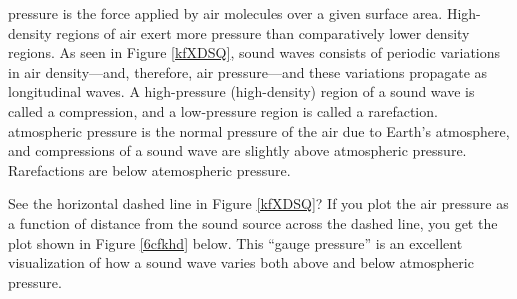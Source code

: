 \documentclass[main.tex]{subfiles}
\begin{document}
\begin{center}
    \captionsetup{type=figure,margin=1in,font=scriptsize}
\end{center}


\Gls{pressure} is the force applied by air molecules over a given surface area. High-density regions of air exert more pressure than comparatively lower density regions. As seen in Figure \ref{kfXDSQ}, sound waves consists of periodic variations in air density---and, therefore, air pressure---and these variations propagate as longitudinal waves. A high-pressure (high-density) region of a sound wave is called a \gls{compression}, and a low-pressure region is called a \gls{rarefaction}. \Gls{atmospheric pressure} is the normal pressure of the air due to Earth's atmosphere, and compressions of a sound wave are slightly above atmospheric pressure. Rarefactions are below atemospheric pressure. 

\vspace{1em}

See the horizontal dashed line in Figure \ref{kfXDSQ}? If you plot the air pressure as a function of distance from the sound source across the dashed line, you get the plot shown in Figure \ref{6cfkhd} below. This ``gauge pressure'' is an excellent visualization of how a sound wave varies both above and below atmospheric pressure.
\vspace{1em}
\end{document}
